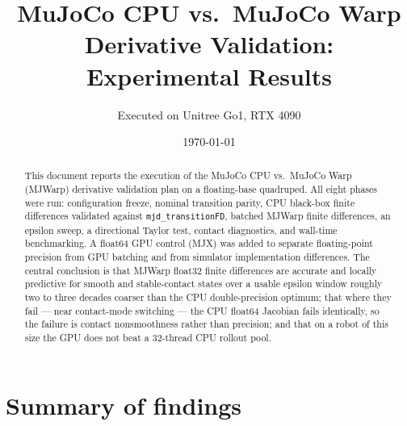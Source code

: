 \documentclass[11pt,a4paper]{article}
\title{\textbf{MuJoCo CPU vs.\ MuJoCo Warp}\\ Derivative Validation: Experimental Results}
\author{Executed on Unitree Go1, RTX 4090}
\date{\today}
\newcommand{\code}[1]{\texttt{\small #1}}
\begin{document}
\maketitle


\begin{abstract}
This document reports the execution of the MuJoCo CPU vs.\ MuJoCo Warp (MJWarp) derivative
validation plan on a floating-base quadruped. All eight phases were run: configuration
freeze, nominal transition parity, CPU black-box finite differences validated against
\code{mjd\_transitionFD}, batched MJWarp finite differences, an epsilon sweep, a directional
Taylor test, contact diagnostics, and wall-time benchmarking. A float64 GPU control (MJX)
was added to separate floating-point precision from GPU batching and from simulator
implementation differences.
The central conclusion is that MJWarp float32 finite differences are accurate and locally
predictive for smooth and stable-contact states over a usable epsilon window roughly two to
three decades coarser than the CPU double-precision optimum; that where they fail --- near
contact-mode switching --- the CPU float64 Jacobian fails identically, so the failure is
contact nonsmoothness rather than precision; and that on a robot of this size the GPU does
not beat a 32-thread CPU rollout pool.
\end{abstract}


\section{Summary of findings}
\end{document}
